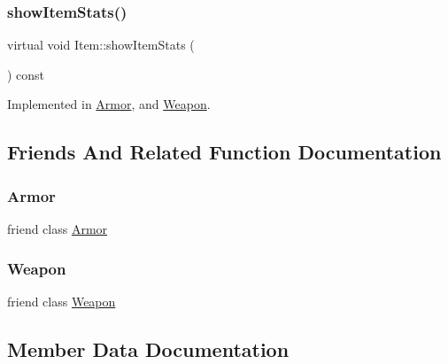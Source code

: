 \mbox{\label{class_item_aaf7dae41afdce432c11261043e8e4e30}} 
\subsubsection{\texorpdfstring{show\+Item\+Stats()}{showItemStats()}}
{\footnotesize\ttfamily virtual void Item\+::show\+Item\+Stats (\begin{DoxyParamCaption}{ }\end{DoxyParamCaption}) const\hspace{0.3cm}{\ttfamily [pure virtual]}}



Implemented in \mbox{\hyperlink{class_armor_a4fe1507d7aaf280a18e19f51a6f8c42d}{Armor}}, and \mbox{\hyperlink{class_weapon_a5bd0118be0d84307c0865a63d907fec7}{Weapon}}.



\subsection{Friends And Related Function Documentation}
\mbox{\label{class_item_aacd78ed1db38c3d74aa80233c16b3e9c}} 
\subsubsection{\texorpdfstring{Armor}{Armor}}
{\footnotesize\ttfamily friend class \mbox{\hyperlink{class_armor}{Armor}}\hspace{0.3cm}{\ttfamily [friend]}}

\mbox{\label{class_item_ab356dbee0f1e915287732c65e8ef61e1}} 
\subsubsection{\texorpdfstring{Weapon}{Weapon}}
{\footnotesize\ttfamily friend class \mbox{\hyperlink{class_weapon}{Weapon}}\hspace{0.3cm}{\ttfamily [friend]}}



\subsection{Member Data Documentation}
\mbox{\label{class_item_a337c41fb4f1ac4b9ab69266722d9afac}} 
